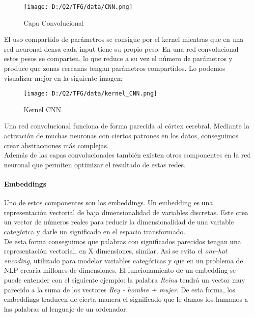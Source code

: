\documentclass[10pt,riqno,a4paper,twoside]{article}\usepackage[]{graphicx}\usepackage[]{color}
\begin{document}
\begin{figure}[h]
\begin{center}
  \caption{Capa Convolucional}
\texttt{[image: D:/Q2/TFG/data/CNN.png]}
\end{center}
\end{figure}





El uso compartido de parámetros se consigue por el kernel mientras que en una red neuronal densa cada input tiene su propio peso. En una red convolucional estos pesos se comparten, lo que reduce a su vez el número de parámetros y produce que zonas cercanas tengan parámetros compartidos.  Lo podemos visualizar mejor en la siguiente imagen:\\ 


\begin{figure}[h]
\begin{center}
  \caption{Kernel CNN}
\texttt{[image: D:/Q2/TFG/data/kernel\_CNN.png]}
\end{center}
\end{figure}


Una red convolucional funciona de forma parecida al córtex cerebral. Mediante la activación de muchas neuronas con ciertos patrones en los datos, conseguimos crear abstracciones más complejas.\\

Además de las capas convolucionales también existen otros componentes en la red neuronal que permiten optimizar el resultado de estas redes. 

\paragraph{Embeddings\\}



Uno de estos componentes son los embeddings. Un embedding es una \label{embedding} representación vectorial de baja dimensionalidad de variables discretas. Este crea un vector de números reales para reducir la dimensionalidad de una variable categórica y darle un significado en el espacio transformado. \\

De esta forma conseguimos que palabras con significados parecidos tengan una representación vectorial, en X dimensiones, similar. Así se evita el \textit{one-hot encoding}, utilizado para modelar variables categóricas y que en un problema de NLP crearía millones de dimensiones. El funcionamiento de un embedding se puede entender con el siguiente ejemplo: la palabra \textit{Reina} tendrá un vector muy parecido a la suma de los vectores \textit{Rey - hombre + mujer}.  De esta forma, los embeddings traducen de cierta manera el significado que le damos los humanos a las palabras al lenguaje de un ordenador.\\
\end{document}
